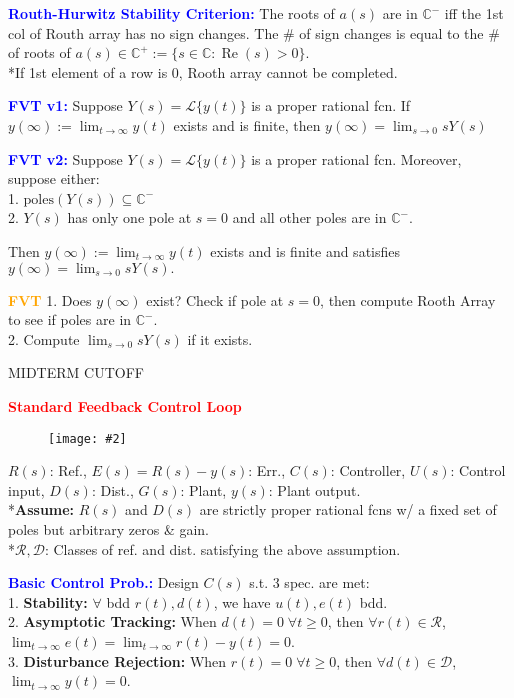 \documentclass[5pt]{extarticle} %
\newcommand{\customFigure}[3][]{%
    \vspace{-1.5em}
    \begin{figure}[H]
        \centering
        \texttt{[image: \#2]}
    \end{figure}
    \vspace{-1.5em}
}
\begin{document}
\begin{paracol}{3}
{    \textcolor{blue}{\textbf{Routh-Hurwitz Stability Criterion:}} The roots of \(a(s)\) are in \(\mathbb{C}^{-}\) iff the 1st col of Routh array has no sign changes. The \# of sign changes is equal to the \# of roots of \(a(s) \in \mathbb{C}^{+} := \{ s \in \mathbb{C} : \operatorname{Re}(s) > 0 \}\). \\
    *If 1st element of a row is 0, Rooth array cannot be completed.
    
    \textcolor{blue}{\textbf{FVT v1:}} Suppose \( Y(s) = \mathcal{L}\{ y(t) \} \) is a proper rational fcn. If $y(\infty) := \lim_{t \to \infty} y(t)$ exists and is finite, then $y(\infty) = \lim_{s \to 0} s Y(s)$

    \textcolor{blue}{\textbf{FVT v2:}} Suppose \(Y(s) = \mathcal{L} \{ y(t) \}\) is a proper rational fcn. Moreover, suppose either: \\
    1. \(\text{poles}(Y(s)) \subseteq \mathbb{C}^{-}\) \\
    2. \( Y(s) \) has only one pole at \( s = 0 \) and all other poles are in \( \mathbb{C}^{-} \).

    Then \( y(\infty) := \lim_{t \to \infty} y(t) \) exists and is finite and satisfies $y(\infty) = \lim_{s \to 0} s Y(s).$
    
    \textcolor{orange}{\textbf{FVT}} 1. Does $y(\infty)$ exist? Check if pole at $s=0$, then compute Rooth Array to see if poles are in $\mathbb{C}^{-}$. \\
    2. Compute $\lim_{s \to 0} s Y(s)$ if it exists.
    
    \switchcolumn 
    \newpage 

    \begin{center}
        MIDTERM CUTOFF
    \end{center}

    \textcolor{red}{\textbf{Standard Feedback Control Loop}}
    \customFigure[0.2]{../Images/L16_0.png}
    *$R(s)$: Ref., $E(s) = R(s) - y(s)$: Err., $C(s)$: Controller, $U(s)$: Control input, $D(s)$: Dist., $G(s)$: Plant, $y(s)$: Plant output. \\
    *\textbf{Assume:} $R(s)$ and $D(s)$ are strictly proper rational fcns w/ a fixed set of poles but arbitrary zeros \& gain. \\
    *$\mathcal{R}, \mathcal{D}$: Classes of ref. and dist. satisfying the above assumption.

    \textcolor{blue}{\textbf{Basic Control Prob.:}} Design $C(s)$ s.t. 3 spec. are met: \\
    1. \textbf{Stability:} $\forall$ bdd $r(t),d(t)$, we have $u(t),e(t)$ bdd. \\
    2. \textbf{Asymptotic Tracking:} When $d(t) = 0 \; \forall t \geq 0$, then $\forall r(t) \in \mathcal{R}$, $\lim_{t \to \infty} e(t) = \lim_{t \rightarrow \infty} r(t) - y(t) = 0$. \\
    3. \textbf{Disturbance Rejection:} When $r(t) = 0 \; \forall t \geq 0$, then $\forall d(t) \in \mathcal{D}$, $\lim_{t \to \infty} y(t) = 0$.

}
\end{paracol}
\end{document}
